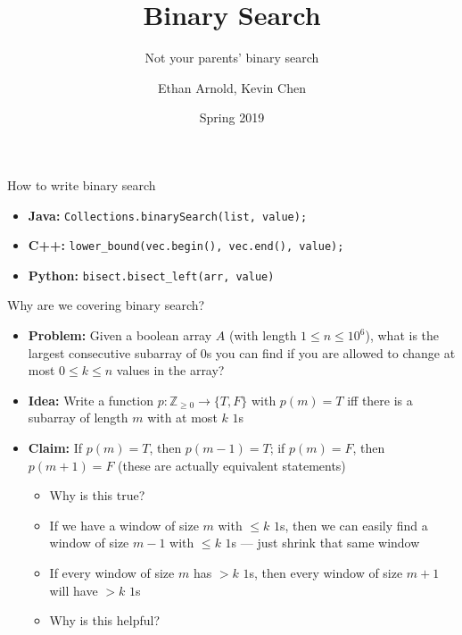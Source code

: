 \documentclass[t]{beamer}
\title{Binary Search}
\subtitle{Not your parents' binary search}
\author{Ethan Arnold, Kevin Chen}
\institute{CS 104C}
\date{Spring 2019}
\newcommand{\Z}{\mathbb{Z}}
\newcommand{\ra}{\rightarrow}
\begin{document}
 
\frame{\titlepage}

\begin{frame}{How to write binary search}
\begin{itemize}
    \item \textbf{Java: } \pause \texttt{Collections.binarySearch(list, value);}
    
    \pause
    
    \item \textbf{C++: } \texttt{lower\_bound(vec.begin(), vec.end(), value);}
    
    \pause
    
    \item \textbf{Python: } \texttt{bisect.bisect\_left(arr, value)}
\end{itemize}
\end{frame} 
 
\begin{frame}{Why are we covering binary search?}
\pause
\begin{itemize}
    \item \textbf{Problem:} Given a boolean array $A$ (with length $1 \leq n \leq 10^6$), what is the largest consecutive subarray of $0$s you can find if you are allowed to change at most $0 \leq k \leq n$ values in the array?
    \pause
    \item \textbf{Idea:} Write a function $p : \Z_{\geq 0} \ra \{T, F\}$ with $p(m) = T$ iff there is a subarray of length $m$ with at most $k$ $1$s
    \pause
    \item \textbf{Claim:} If $p(m) = T$, then $p(m-1) = T$; if $p(m) = F$, then $p(m+1) = F$ (these are actually equivalent statements)
    \begin{itemize}
        \item Why is this true?
        \pause
        \item If we have a window of size $m$ with $\leq k$ $1$s, then we can easily find a window of size $m - 1$ with $\leq k$ $1$s --- just shrink that same window
        \item If every window of size $m$ has $> k$ $1$s, then every window of size $m + 1$ will have $> k$ $1$s
        \pause
        \item Why is this helpful?
    \end{itemize}
\end{itemize}
\end{frame}
\end{document}
